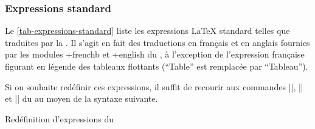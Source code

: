 \subsubsection{Expressions standard}
\label{sec-expressions-standard}%
%

Le \vref{tab-expressions-standard} liste les expressions \LaTeX{} standard
telles que traduites par la \yatCl{}. Il s'agit en fait des traductions en
français et en anglais fournies par les modules \package*+{frenchb} et
\package*+{english} du , à l'exception de l'expression française
figurant en légende des tableaux flottants (\enquote{Table} est remplacée par
\enquote{Tableau}).%
%

Si on souhaite redéfinir ces expressions, il suffit de recourir aux commandes
|\addto|, |\captionsfrench| et |\captionsenglish| du  au moyen
de la syntaxe suivante.

\begin{preamblecode}[title=Par exemple dans le \File{\configurationfile}]
\addto{}
\addto{}
\end{preamblecode}
\begin{table}[hb]
  \centering
  \caption{Valeurs et commandes d'expressions \LaTeX{} standard fournies par la \yatCl{}}
  \label{tab-expressions-standard}
  
\end{table}
%
\begin{dbexample}{Redéfinition d'expressions du }{}
\begin{preamblecode}[title=Redéfinition des expressions pour les résumés]
\addto{}
\addto{}
\end{preamblecode}
\end{dbexample}

